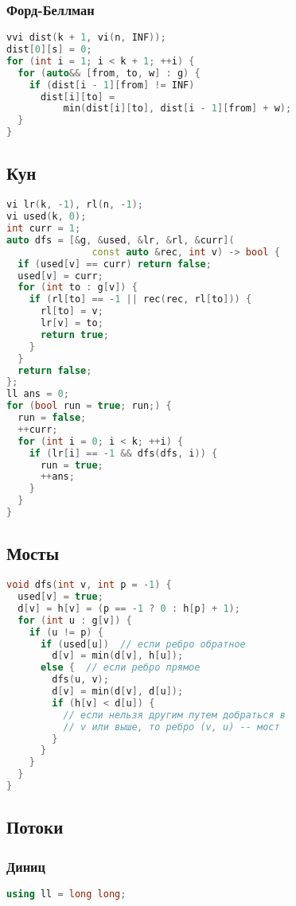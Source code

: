 \documentclass[10pt,a4paper,landscape,twosided]{extarticle}
\begin{document}
\begin{multicols}{3}
\subsubsection{Форд-Беллман}
\begin{lstlisting}[language=C++]
vvi dist(k + 1, vi(n, INF));
dist[0][s] = 0;
for (int i = 1; i < k + 1; ++i) {
  for (auto&& [from, to, w] : g) {
    if (dist[i - 1][from] != INF)
      dist[i][to] =
          min(dist[i][to], dist[i - 1][from] + w);
  }
}
\end{lstlisting}

\subsection{Кун}
\begin{lstlisting}[language=C++]
vi lr(k, -1), rl(n, -1);
vi used(k, 0);
int curr = 1;
auto dfs = [&g, &used, &lr, &rl, &curr](
               const auto &rec, int v) -> bool {
  if (used[v] == curr) return false;
  used[v] = curr;
  for (int to : g[v]) {
    if (rl[to] == -1 || rec(rec, rl[to])) {
      rl[to] = v;
      lr[v] = to;
      return true;
    }
  }
  return false;
};
ll ans = 0;
for (bool run = true; run;) {
  run = false;
  ++curr;
  for (int i = 0; i < k; ++i) {
    if (lr[i] == -1 && dfs(dfs, i)) {
      run = true;
      ++ans;
    }
  }
}
\end{lstlisting}

\subsection{Мосты}
\begin{lstlisting}[language=C++]
void dfs(int v, int p = -1) {
  used[v] = true;
  d[v] = h[v] = (p == -1 ? 0 : h[p] + 1);
  for (int u : g[v]) {
    if (u != p) {
      if (used[u])  // если ребро обратное
        d[v] = min(d[v], h[u]);
      else {  // если ребро прямое
        dfs(u, v);
        d[v] = min(d[v], d[u]);
        if (h[v] < d[u]) {
          // если нельзя другим путем добраться в
          // v или выше, то ребро (v, u) -- мост
        }
      }
    }
  }
}
\end{lstlisting}

\subsection{Потоки}

\subsubsection{Диниц}
\begin{lstlisting}[language=C++]
using ll = long long;


\end{lstlisting}
\end{multicols}
\end{document}
